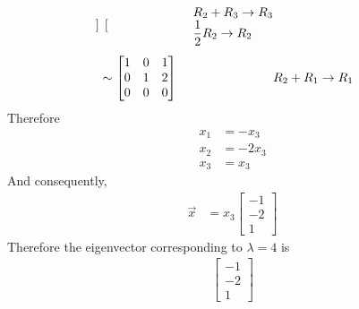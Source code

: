 \documentclass[10pt,letterpaper,final]{report}
\newcommand{\reason}[1]{&& \text{#1}}
\begin{document}
\begin{enumerate}[label=(\alph*)]
\begin{align*}
\begin{bmatrix}
                                            \end{bmatrix} \reason{
                                                            \begin{tabular}[c]{@{}l@{}}$R_2 + R_3 \to R_3$\\ $\frac{1}{2}R_2 \to R_2$\end{tabular}}     \\[1ex]
                                     & \sim \begin{bmatrix}
                                              1 & 0 & 1 \\
                                              0 & 1 & 2 \\
                                              0 & 0 & 0
                                            \end{bmatrix} \reason{$R_2 + R_1 \to R_1$}
        \end{align*}
        Therefore
        \begin{align*}
          x_1 & = -x_3  \\
          x_2 & = -2x_3 \\
          x_3 & = x_3
        \end{align*}
        And consequently,
        \begin{align*}
          \vec{x} & = x_3\begin{bmatrix}
                           -1 \\
                           -2 \\
                           1
                         \end{bmatrix}
        \end{align*}
        Therefore the eigenvector corresponding to $\lambda = 4$ is
        \begin{align*}
          \begin{bmatrix}
            -1 \\
            -2 \\
            1
          \end{bmatrix}
        \end{align*}


\end{enumerate}
\end{document}
